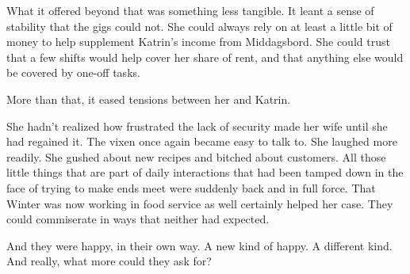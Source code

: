 What it offered beyond that was something less tangible. It leant a sense of stability that the gigs could not. She could always rely on at least a little bit of money to help supplement Katrin's income from Middagsbord. She could trust that a few shifts would help cover her share of rent, and that anything else would be covered by one-off tasks.

More than that, it eased tensions between her and Katrin.

She hadn't realized how frustrated the lack of security made her wife until she had regained it. The vixen once again became easy to talk to. She laughed more readily. She gushed about new recipes and bitched about customers. All those little things that are part of daily interactions that had been tamped down in the face of trying to make ends meet were suddenly back and in full force. That Winter was now working in food service as well certainly helped her case. They could commiserate in ways that neither had expected.

And they were happy, in their own way. A new kind of happy. A different kind. And really, what more could they ask for?
